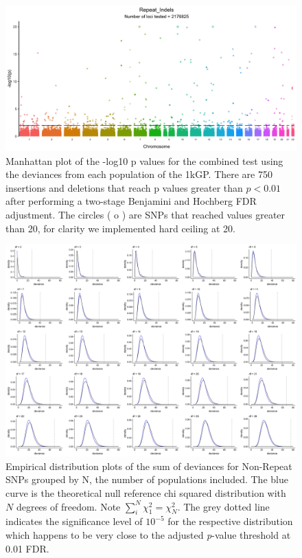 \documentclass[9pt,lineno]{elife}
\begin{document}
\begin{figure}[h]
\includegraphics[width=\hsize,keepaspectratio]{./Figures/ManhattanPlot_Repeat_Indels.jpg}

\caption{Manhattan plot of the -log10 p values for the combined test using the deviances from each population of the 1kGP. 
There are 750 insertions and deletions that reach p values greater than $ p < 0.01$ after performing a two-stage Benjamini and Hochberg FDR adjustment. 
The circles ( o ) are SNPs that reached values greater than 20, for clarity we implemented hard ceiling at 20.}
 \label{RI_Manhattan}
\end{figure}

\begin{figure}[h]
\includegraphics[width=\hsize,keepaspectratio]{./Figures/AllDeviances.jpg}

\caption{Empirical distribution plots of the sum of deviances for Non-Repeat SNPs grouped by N, the number of populations included. The blue curve is the theoretical null reference chi squared distribution with $N$ degrees of freedom. Note $\sum_i^N  \chi^2_1= \chi^2_N$. The grey dotted line indicates the significance level of $10^{-5}$ for the respective distribution which happens to be very close to the adjusted \textit{p}-value threshold at 0.01 FDR. }
\label{Deviances}
\end{figure}
\end{document}
